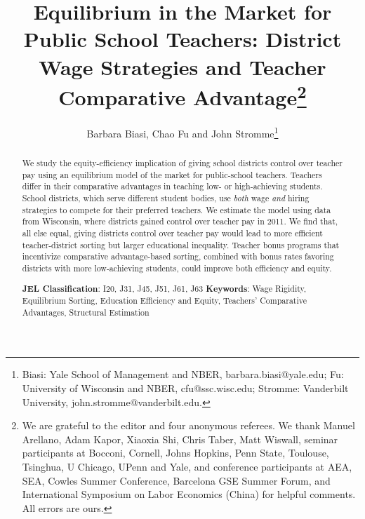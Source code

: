 \documentclass[notitlepage,12pt]{article}%
\begin{document}
\title{Equilibrium in the Market for Public School Teachers: District Wage Strategies
and Teacher Comparative Advantage\thanks{We are grateful to the editor and four anonymous referees. We thank Manuel Arellano, Adam Kapor,
Xiaoxia Shi, Chris Taber, Matt Wiswall, seminar participants at Bocconi,
Cornell, Johns Hopkins, Penn State, Toulouse, Tsinghua, U Chicago, UPenn and
Yale, and conference participants at AEA, SEA, Cowles Summer Conference,
Barcelona GSE Summer Forum, and International Symposium on Labor Economics
(China) for helpful comments. All errors are ours. }\\}
\author{Barbara Biasi, Chao Fu and John Stromme\thanks{Biasi: Yale School of
Management and NBER, barbara.biasi@yale.edu; Fu: University of Wisconsin and
NBER, cfu@ssc.wisc.edu; Stromme: Vanderbilt University,
john.stromme@vanderbilt.edu. } }
\maketitle

\begin{abstract}
We study the equity-efficiency implication of giving school districts control
over teacher pay using an equilibrium model of the market for public-school
teachers. Teachers differ in their comparative advantages in teaching low- or
high-achieving students. School districts, which serve different student
bodies, use \emph{both} wage \emph{and} hiring strategies to compete for their
preferred teachers. We estimate the model using data from Wisconsin, where
districts gained control over teacher pay in 2011. We find that, all else
equal, giving districts control over teacher pay would lead to more efficient
teacher-district sorting but larger educational inequality. Teacher bonus
programs that incentivize comparative advantage-based sorting, combined with
bonus rates favoring districts with more low-achieving students, could improve
both efficiency and equity.

\bigskip\noindent\textbf{JEL Classification}: I20, J31, J45, J51, J61, J63
\newline\textbf{Keywords}: Wage Rigidity, Equilibrium Sorting, Education
Efficiency and Equity, Teachers' Comparative Advantages, Structural Estimation

\end{abstract}

\thispagestyle{empty}

\clearpage%
\end{document}

